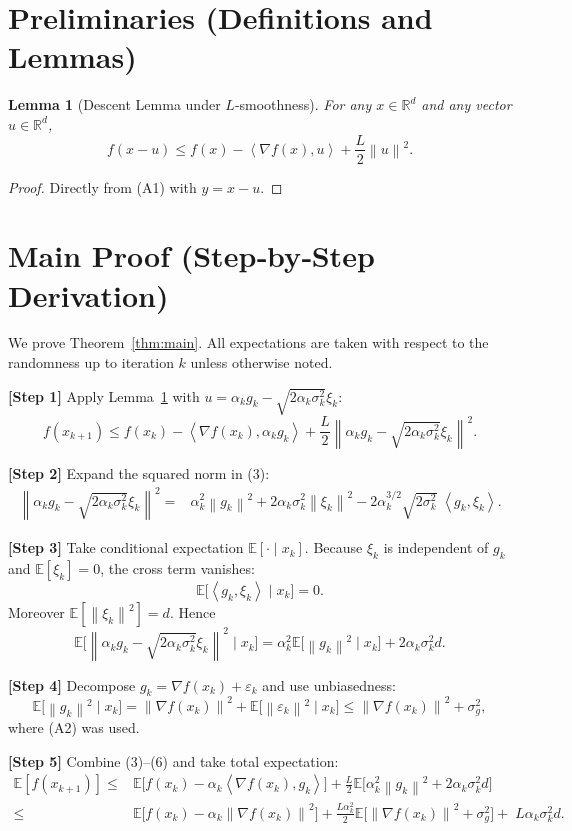 \documentclass{article}
\newtheorem{lemma}{Lemma}
\newcommand{\E}{\mathbb{E}}
\newcommand{\R}{\mathbb{R}}
\newcommand{\norm}[1]{\left\|#1\right\|}
\newcommand{\ip}[2]{\left\langle #1,#2\right\rangle}
\newcommand{\grad}{\nabla}
\begin{document}
\newpage
\section*{Preliminaries (Definitions and Lemmas)}
\begin{lemma}[Descent Lemma under $L$‑smoothness]\label{lem:descent}
For any $x\in\R^{d}$ and any vector $u\in\R^{d}$,
\[
f(x-u)\le f(x)-\ip{\grad f(x)}{u}+\frac{L}{2}\norm{u}^{2}.
\tag{2}
\]
\end{lemma}
\begin{proof}
Directly from (A1) with $y=x-u$.
\end{proof}

\section*{Main Proof (Step‑by‑Step Derivation)}
We prove Theorem~\ref{thm:main}.  
All expectations are taken with respect to the randomness up to iteration $k$ unless otherwise noted.

\noindent\textbf{[Step 1]} Apply Lemma~\ref{lem:descent} with $u=\alpha_k g_k-\sqrt{2\alpha_k\sigma_k^{2}}\xi_k$:
\[
f(x_{k+1})\le f(x_k)-\ip{\grad f(x_k)}{\alpha_k g_k}
+\frac{L}{2}\norm{\alpha_k g_k-\sqrt{2\alpha_k\sigma_k^{2}}\xi_k}^{2}.
\tag{3}
\]

\noindent\textbf{[Step 2]} Expand the squared norm in (3):
\[
\begin{aligned}
\norm{\alpha_k g_k-\sqrt{2\alpha_k\sigma_k^{2}}\xi_k}^{2}
=&\alpha_k^{2}\norm{g_k}^{2}
+2\alpha_k\sigma_k^{2}\norm{\xi_k}^{2}
-2\alpha_k^{3/2}\sqrt{2\sigma_k^{2}}\;\ip{g_k}{\xi_k}.
\end{aligned}
\tag{4}
\]

\noindent\textbf{[Step 3]} Take conditional expectation $\E[\cdot\mid x_k]$.
Because $\xi_k$ is independent of $g_k$ and $\E[\xi_k]=0$, the cross term vanishes:
\[
\E\!\big[\ip{g_k}{\xi_k}\mid x_k\big]=0.
\]
Moreover $\E[\norm{\xi_k}^{2}]=d$. Hence
\[
\E\!\big[\norm{\alpha_k g_k-\sqrt{2\alpha_k\sigma_k^{2}}\xi_k}^{2}\mid x_k\big]
=
\alpha_k^{2}\E\!\big[\norm{g_k}^{2}\mid x_k\big]
+2\alpha_k\sigma_k^{2}d .
\tag{5}
\]

\noindent\textbf{[Step 4]} Decompose $g_k=\grad f(x_k)+\varepsilon_k$ and use unbiasedness:
\[
\E\!\big[\norm{g_k}^{2}\mid x_k\big]
= \norm{\grad f(x_k)}^{2}
+\E\!\big[\norm{\varepsilon_k}^{2}\mid x_k\big]
\le \norm{\grad f(x_k)}^{2}+\sigma_{g}^{2},
\tag{6}
\]
where (A2) was used.

\noindent\textbf{[Step 5]} Combine (3)–(6) and take total expectation:
\[
\begin{aligned}
\E[f(x_{k+1})]
\le &\E\!\big[f(x_k)-\alpha_k\ip{\grad f(x_k)}{g_k}\big]
+\frac{L}{2}\E\!\big[\alpha_k^{2}\norm{g_k}^{2}+2\alpha_k\sigma_k^{2}d\big] \\
\le &\E\!\big[f(x_k)-\alpha_k\norm{\grad f(x_k)}^{2}\big]
+\frac{L\alpha_k^{2}}{2}\E\!\big[\norm{\grad f(x_k)}^{2}+\sigma_{g}^{2}\big]
+\;L\alpha_k\sigma_k^{2}d .
\end{aligned}
\tag{7}
\]
\end{document}
